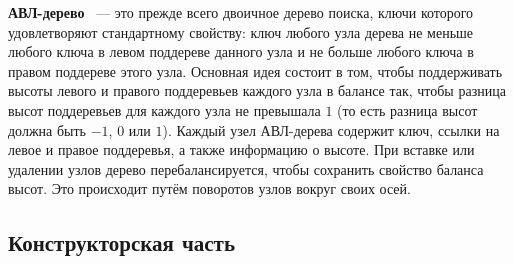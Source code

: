 \documentclass[12pt, a4paper]{article}
\begin{document}
\textbf{АВЛ-дерево}~\cite{book} --- это прежде всего двоичное дерево поиска, ключи которого удовлетворяют стандартному свойству: ключ любого узла дерева не меньше любого ключа в левом поддереве данного узла и не больше любого ключа в правом поддереве этого узла. Основная идея состоит в том, чтобы поддерживать высоты левого и правого поддеревьев каждого узла в балансе так, чтобы разница высот поддеревьев для каждого узла не превышала $1$ (то есть разница высот должна быть $-1$, $0$ или $1$). Каждый узел АВЛ-дерева содержит ключ, ссылки на левое и правое поддеревья, а также информацию о высоте. При вставке или удалении узлов дерево перебалансируется, чтобы сохранить свойство баланса высот. Это происходит путём поворотов узлов вокруг своих осей.

\newpage
\begin{center}
    \section{Конструкторская часть}
\end{center}
\end{document}

